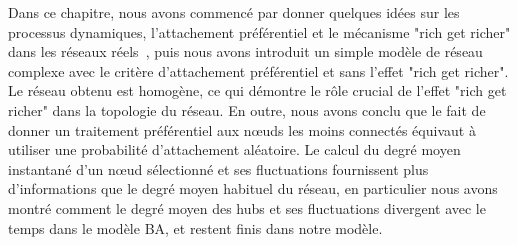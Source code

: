 Dans ce chapitre, nous avons commencé par donner quelques idées sur les processus dynamiques, l'attachement préférentiel et le mécanisme "rich get richer" dans les réseaux réels~, puis nous avons introduit un simple modèle de réseau complexe avec le critère d'attachement préférentiel et sans l'effet "rich get richer". Le réseau obtenu est homogène, ce qui démontre le rôle crucial de l'effet "rich get richer" dans la topologie du réseau. En outre, nous avons conclu que le fait de donner un traitement préférentiel aux nœuds les moins connectés équivaut à utiliser une probabilité d'attachement aléatoire. Le calcul du degré moyen instantané d'un nœud sélectionné et ses fluctuations fournissent plus d'informations que le degré moyen habituel du réseau, en particulier nous avons montré comment le degré moyen des hubs et ses fluctuations divergent avec le temps dans le modèle BA, et restent finis dans notre modèle.
\let\cleardoublepage\clearpage
